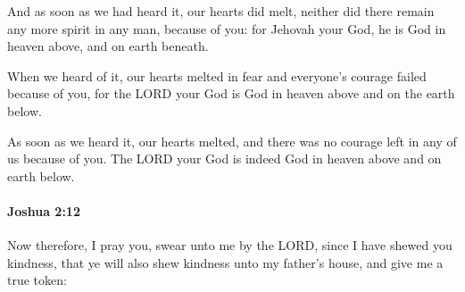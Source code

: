 			\begin{versebox}
					\item[BHS] 
					\item[ASV] And as soon as we had heard it, our hearts did melt, neither did there remain any more spirit in any man, because of you: for Jehovah your God, he is God in heaven above, and on earth beneath.
					\item[NIV] When we heard of it, our hearts melted in fear and everyone’s courage failed because of you, for the LORD your God is God in heaven above and on the earth below.
					\item[NRSV] As soon as we heard it, our hearts melted, and there was no courage left in any of us because of you. The LORD your God is indeed God in heaven above and on earth below.
			\end{versebox}

		\paragraph{Joshua 2:12} %
			\label{JOSHUA-2-12}

			Now therefore, I pray you, swear unto me by the LORD, since I have shewed you kindness, that ye will also shew kindness unto my father’s house, and give me a true token:

